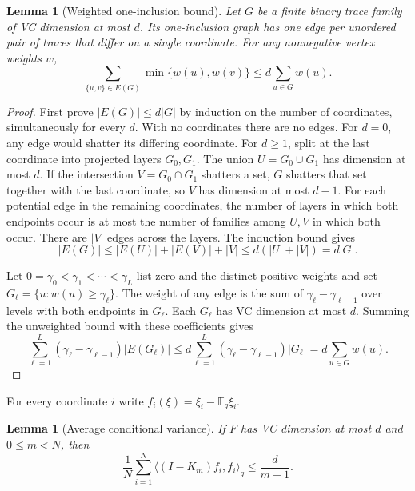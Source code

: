 \documentclass[11pt]{article}
\newtheorem{lemma}[theorem]{Lemma}
\theoremstyle{definition}\newtheorem{definition}[theorem]{Definition}
\begin{document}
\begin{lemma}[Weighted one-inclusion bound]
\label{lem:weighted-one-inclusion}
Let $G$ be a finite binary trace family of VC dimension at most $d$.
Its one-inclusion graph has one edge per unordered pair of traces that
differ on a single coordinate. For any nonnegative vertex weights $w$,
\[
  \sum_{\{u,v\}\in E(G)}\min\{w(u),w(v)\}
  \leq d\sum_{u\in G}w(u).
\]
\end{lemma}

\begin{proof}
First prove $|E(G)|\leq d|G|$ by induction on the number of coordinates,
simultaneously for every $d$. With no coordinates there are no edges.
For $d=0$, any edge would shatter its differing coordinate.
For $d\geq1$, split at the last coordinate into projected layers $G_0,G_1$.
The union $U=G_0\cup G_1$ has dimension at most $d$. If the intersection
$V=G_0\cap G_1$ shatters a set, $G$ shatters that set together with the
last coordinate, so $V$ has dimension at most $d-1$.
For each potential edge in the remaining coordinates, the number of layers
in which both endpoints occur is at most the number of families among
$U,V$ in which both occur. There are $|V|$ edges across the layers.
The induction bound gives
\[
  |E(G)|\leq |E(U)|+|E(V)|+|V|
     \leq d(|U|+|V|)=d|G|.
\]

Let $0=\gamma_0<\gamma_1<\cdots<\gamma_L$ list zero and the distinct
positive weights and set $G_\ell=\{u:w(u)\geq\gamma_\ell\}$. The weight
of any edge is the sum of $\gamma_\ell-\gamma_{\ell-1}$ over levels with
both endpoints in $G_\ell$. Each $G_\ell$ has VC dimension at most $d$.
Summing the unweighted bound with these coefficients gives
\[
  \sum_{\ell=1}^L(\gamma_\ell-\gamma_{\ell-1})|E(G_\ell)|
  \leq d\sum_{\ell=1}^L(\gamma_\ell-\gamma_{\ell-1})|G_\ell|
  =d\sum_{u\in G}w(u).
\]
\end{proof}

For every coordinate $i$ write $f_i(\xi)=\xi_i-\mathbb E_q\xi_i$.

\begin{lemma}[Average conditional variance]
\label{lem:conditional-variance}
If $F$ has VC dimension at most $d$ and $0\leq m<N$, then
\begin{equation}
  \label{eq:averaged-conditional-variance}
  \frac1N\sum_{i=1}^N\langle(I-K_m)f_i,f_i\rangle_q
  \leq\frac{d}{m+1}.
\end{equation}
\end{lemma}
\end{document}
